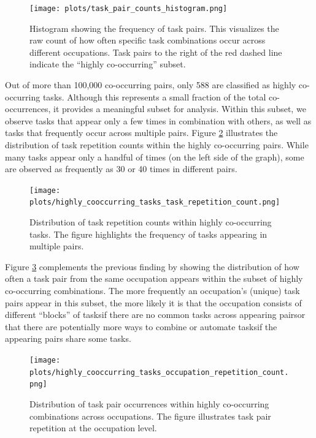 \documentclass{article}
\theoremstyle{plain}
\theoremstyle{plain}
\begin{document}
\begin{figure}[htbp]
  \centering
  \texttt{[image: plots/task\_pair\_counts\_histogram.png]}
  \caption{Histogram showing the frequency of task pairs. This visualizes the raw count of how often specific task combinations occur across different occupations. Task pairs to the right of the red dashed line indicate the “highly co-occurring” subset.}
  \label{fig:pair_counts}
\end{figure}

Out of more than 100,000 co-occurring pairs, only 588 are classified as highly co-occurring tasks. 
Although this represents a small fraction of the total co-occurrences, it provides a meaningful subset for analysis.
Within this subset, we observe tasks that appear only a few times in combination with others, as well as tasks that frequently occur across multiple pairs. 
Figure \ref{fig:high_cooc_task} illustrates the distribution of task repetition counts within the highly co-occurring pairs. 
While many tasks appear only a handful of times (on the left side of the graph), some are observed as frequently as 30 or 40 times in different pairs.

\begin{figure}[htbp]
  \centering
  \texttt{[image: plots/highly\_cooccurring\_tasks\_task\_repetition\_count.png]}
  \caption{Distribution of task repetition counts within highly co-occurring tasks. The figure highlights the frequency of tasks appearing in multiple pairs.}
  \label{fig:high_cooc_task}
\end{figure}

Figure \ref{fig:high_cooc_occ} complements the previous finding by showing the distribution of how often a task pair from the same occupation appears within the subset of highly co-occurring combinations.
The more frequently an occupation’s (unique) task pairs appear in this subset, the more likely it is that the occupation consists of different “blocks” of tasks\textemdash if there are no common tasks across appearing pairs\textemdash or that there are potentially more ways to combine or automate tasks\textemdash if the appearing pairs share some tasks.

\begin{figure}[htbp]
  \centering
  \texttt{[image: plots/highly\_cooccurring\_tasks\_occupation\_repetition\_count.png]}
  \caption{Distribution of task pair occurrences within highly co-occurring combinations across occupations. The figure illustrates task pair repetition at the occupation level.}
  \label{fig:high_cooc_occ}
\end{figure}
\end{document}
